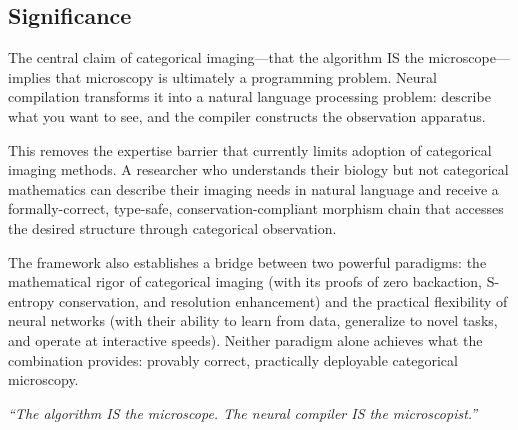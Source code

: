 \documentclass[11pt,a4paper]{article}
\theoremstyle{definition}
\theoremstyle{remark}
\begin{document}
\subsection{Significance}

The central claim of categorical imaging---that the algorithm IS the microscope---implies that microscopy is ultimately a programming problem. Neural compilation transforms it into a natural language processing problem: describe what you want to see, and the compiler constructs the observation apparatus.

This removes the expertise barrier that currently limits adoption of categorical imaging methods. A researcher who understands their biology but not categorical mathematics can describe their imaging needs in natural language and receive a formally-correct, type-safe, conservation-compliant morphism chain that accesses the desired structure through categorical observation.

The framework also establishes a bridge between two powerful paradigms: the mathematical rigor of categorical imaging (with its proofs of zero backaction, S-entropy conservation, and resolution enhancement) and the practical flexibility of neural networks (with their ability to learn from data, generalize to novel tasks, and operate at interactive speeds). Neither paradigm alone achieves what the combination provides: provably correct, practically deployable categorical microscopy.

\vspace{1em}
\noindent\textit{``The algorithm IS the microscope. The neural compiler IS the microscopist.''}



\end{document}
